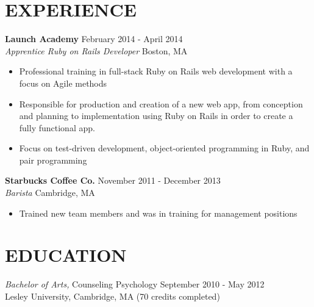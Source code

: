\documentclass[margin]{res}
\begin{document}
\begin{resume}
  
\section{EXPERIENCE}  {\bf Launch Academy} \hfill February 2014 - April 2014 \\
			{\sl Apprentice Ruby on Rails Developer} \hfill Boston, MA \
			\begin{itemize}  \itemsep -2pt %
			\item Professional training in full-stack Ruby on Rails web development with a focus on Agile methods
			\item  Responsible for production and creation of a new web app, from conception and planning to implementation using Ruby on Rails in order to create a fully functional app.
			\item Focus on test-driven development, object-oriented programming in Ruby, and pair programming

			\end{itemize}
			{\bf Starbucks Coffee Co.} \hfill November 2011 - December 2013 \\
			{\sl Barista } \hfill Cambridge, MA \
			\begin{itemize} \itemsep -2pt %
			\item Trained new team members and was in training for management positions
			\end{itemize}

\section{EDUCATION} {\sl Bachelor of Arts,} Counseling Psychology \hfill September 2010 - May 2012\\
                Lesley University, Cambridge, MA 
                 (70 credits completed) \\
                
 
\end{resume}
\end{document}
